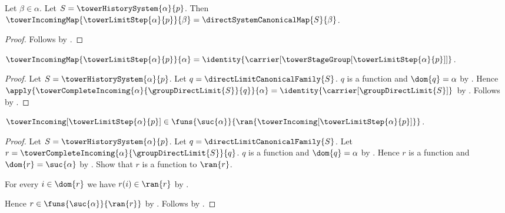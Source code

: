 \begin{proposition}\label{tower_limit_step_incoming_earlier}
    Let $\beta\in\alpha$.
    Let $S=\towerHistorySystem{\alpha}{p}$.
    Then $\towerIncomingMap{\towerLimitStep{\alpha}{p}}{\beta}=
        \directSystemCanonicalMap{S}{\beta}$.
\end{proposition}
\begin{proof}
    Follows by
        .
\end{proof}

\begin{proposition}\label{tower_limit_step_incoming_current}
    $\towerIncomingMap{\towerLimitStep{\alpha}{p}}{\alpha}=
        \identity{\carrier[
            \towerStageGroup[\towerLimitStep{\alpha}{p}]]}$.
\end{proposition}
\begin{proof}
    Let $S=\towerHistorySystem{\alpha}{p}$.
    Let $q=\directLimitCanonicalFamily{S}$.
    $q$ is a function and $\dom{q}=\alpha$ by
        .
    Hence $\apply{
            \towerCompleteIncoming{\alpha}{\groupDirectLimit{S}}{q}}
            {\alpha}=\identity{\carrier[\groupDirectLimit{S}]}$ by
        .
    Follows by
        .
\end{proof}

\begin{proposition}\label{tower_limit_step_incoming_type}
    $\towerIncoming[\towerLimitStep{\alpha}{p}]\in
        \funs{\suc{\alpha}}{
            \ran{\towerIncoming[\towerLimitStep{\alpha}{p}]}}$.
\end{proposition}
\begin{proof}
    Let $S=\towerHistorySystem{\alpha}{p}$.
    Let $q=\directLimitCanonicalFamily{S}$.
    Let $r=\towerCompleteIncoming{\alpha}{\groupDirectLimit{S}}{q}$.
    $q$ is a function and $\dom{q}=\alpha$ by
        .
    Hence $r$ is a function and $\dom{r}=\suc{\alpha}$ by
        .
    Show that $r$ is a function to $\ran{r}$.
    \begin{subproof}
        For every $i\in\dom{r}$ we have $r(i)\in\ran{r}$ by
            .
    \end{subproof}
    Hence $r\in\funs{\suc{\alpha}}{\ran{r}}$ by
        .
    Follows by .
\end{proof}

